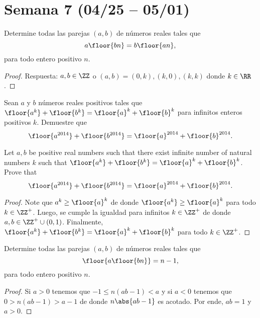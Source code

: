 \section{Semana 7 (04/25 -- 05/01)}


\begin{probEG}
	Determine todas las parejas $(a,b)$ de números reales tales que
	\[a\floor{bn}=b\floor{an},\]
	para todo entero positivo $n$.
\end{probEG}

\begin{proof}
	Respuesta: $a,b\in\ZZ$ o $(a,b)=(0,k),(k,0),(k,k)$ donde $k\in\RR$.
\end{proof}

\begin{probEG}
	Sean $a$ y $b$ números reales positivos tales que $\floor{a^k}+\floor{b^k}=\floor{a}^k+\floor{b}^k$ para infinitos enteros positivos $k$. Demuestre que
	\[\floor{a^{2014}}+\floor{b^{2014}}=\floor{a}^{2014}+\floor{b}^{2014}.\]
	\begin{hint}
		Let $a,b$ be positive real numbers such that there exist infinite number of natural numbers $k$ such that $\floor{a^k}+\floor{b^k}=\floor{a}^k+\floor{b}^k$. Prove that
		\[\floor{a^{2014}}+\floor{b^{2014}}=\floor{a}^{2014}+\floor{b}^{2014}.\]
	\end{hint}
\end{probEG}

\begin{proof}
	Note que $a^k\ge\floor{a}^k$ de donde $\floor{a^k}\ge\floor{a}^k$ para todo $k\in\ZZ^+$. Luego, se cumple la igualdad para infinitos $k\in\ZZ^+$ de donde $a,b\in\ZZ^+\cup(0,1)$. Finalmente, $\floor{a^k}+\floor{b^k}=\floor{a}^k+\floor{b}^k$ para todo $k\in\ZZ^+$.
\end{proof}

\begin{probEG}
	Determine todas las parejas $(a,b)$ de números reales tales que
	\[\floor{a\floor{bn}}=n-1,\]
	para todo entero positivo $n$.
\end{probEG}

\begin{proof}
	Si $a>0$ tenemos que $-1\le n(ab-1)<a$ y si $a<0$ tenemos que $0>n(ab-1)>a-1$ de donde $n\abs{ab-1}$ es acotado. Por ende, $ab=1$ y $a>0$.
\end{proof}

